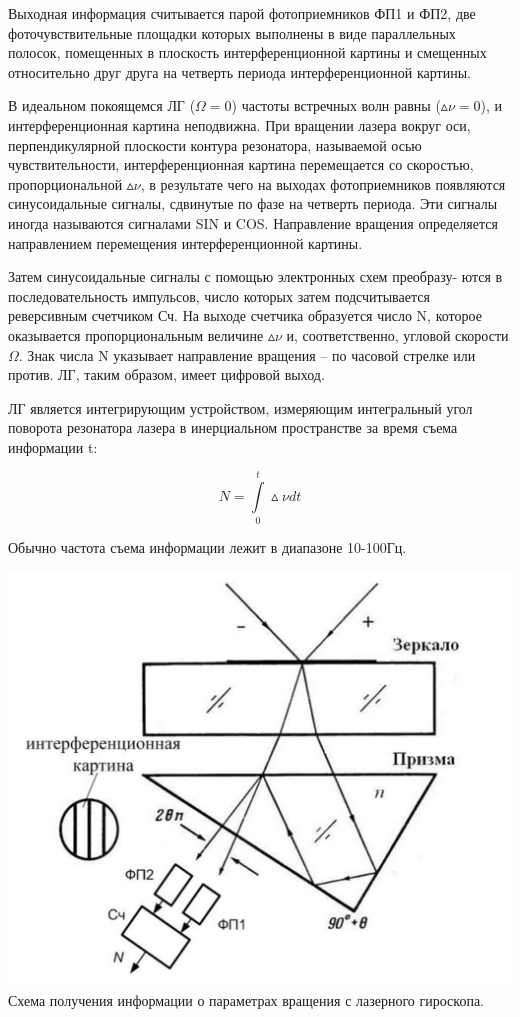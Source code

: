 \documentclass[a4paper,12pt]{article} %
\begin{document}
Выходная информация считывается парой фотоприемников ФП1 и ФП2,
две фоточувствительные площадки которых выполнены в виде параллельных
полосок, помещенных в плоскость интерференционной картины и смещенных
относительно друг друга на четверть периода интерференционной картины.

В идеальном покоящемся ЛГ ($\Omega = 0$) частоты встречных волн равны ($\vartriangle \! \! \nu = 0$), и интерференционная картина неподвижна. При вращении лазера вокруг оси, перпендикулярной плоскости контура резонатора, называемой осью чувствительности, интерференционная картина перемещается со скоростью, пропорциональной $\vartriangle \! \! \nu$, в результате чего на выходах фотоприемников появляются
синусоидальные сигналы, сдвинутые по фазе на четверть периода. Эти сигналы
иногда называются сигналами SIN и COS. Направление вращения определяется направлением перемещения интерференционной картины.

Затем синусоидальные сигналы с помощью электронных схем преобразу-
ются в последовательность импульсов, число которых затем подсчитывается
реверсивным счетчиком Сч. На выходе счетчика образуется число N, которое
оказывается пропорциональным величине $\vartriangle \! \! \nu$ и, соответственно, угловой скорости $\Omega$. Знак числа N указывает направление вращения -- по часовой стрелке или против. ЛГ, таким образом, имеет цифровой выход.

ЛГ является интегрирующим устройством, измеряющим интегральный
угол поворота резонатора лазера в инерциальном пространстве за время съема
информации t:

\begin{equation}
    N = \int\limits_0^t \vartriangle \!\! \nu dt
\end{equation}

Обычно частота съема информации лежит в диапазоне 10-100Гц.

\begin{center}
    \includegraphics[scale=0.5]{pic3}\\
    \caption{Схема получения информации о параметрах вращения с лазерного гироскопа.}
\end{center}
\end{document}
